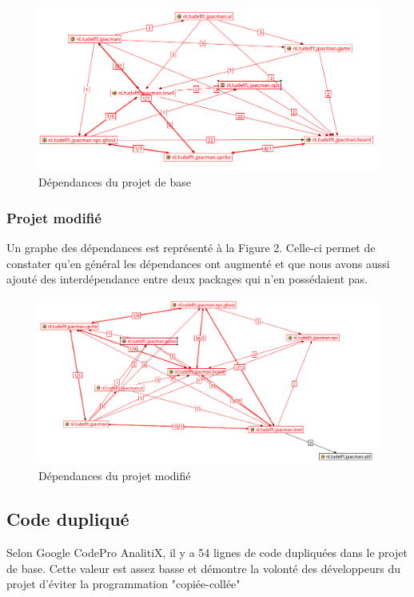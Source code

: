 \documentclass[a4paper,12pt]{report} %
\begin{document}
\begin{figure}[!h]
\begin{center}\includegraphics[scale=0.5]{ressources/final_initial_dependencies}\end{center}
\caption{Dépendances du projet de base}
\end{figure}

\subsubsection{Projet modifié}
Un graphe des dépendances est représenté à la Figure 2. Celle-ci permet de constater qu'en général les dépendances ont augmenté et que nous avons aussi
ajouté des interdépendance entre deux packages qui n'en possédaient
pas.

\begin{figure}[!h]
\begin{center}\includegraphics[scale=0.5]{ressources/final_new_dependencies}\end{center}\caption{Dépendances du projet modifié}


\end{figure}

\subsection{Code dupliqué}
Selon Google CodePro AnalitiX, il y a 54 lignes de code dupliquées
dans le projet de base. Cette valeur est assez basse et démontre la
volonté des développeurs du projet d'éviter la programmation "copiée-collée"
\end{document}
